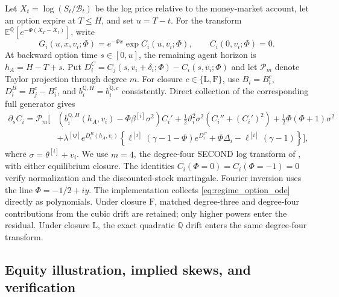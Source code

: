 \documentclass[11pt]{article}
\theoremstyle{remark}
\newcommand{\E}{\mathbb{E}}
\newcommand{\QQ}{\mathbb{Q}}
\begin{document}
Let $X_t=\log(S_t/\mathcal B_t)$ be the log price relative to the money-market
account, let an option expire at $T\le H$, and set $u=T-t$.  For the transform
$\E^{\QQ}[e^{-\Phi(X_T-X_t)}]$, write
\begin{equation}\label{eq:regime_option_ansatz}
G_i(u,x,v_i;\Phi)=e^{-\Phi x}\exp C_i(u,v_i;\Phi),
\qquad C_i(0,v_i;\Phi)=0.
\end{equation}
At backward option time $s\in[0,u]$, the remaining agent horizon is
$h_A=H-T+s$.  Put
$D_i^C=C_j(s,v_i+\delta_i;\Phi)-C_i(s,v_i;\Phi)$ and let $\mathcal P_m$
denote Taylor projection through degree $m$.  For closure
$c\in\{\mathrm L,\mathrm F\}$, use $B_i=B_i^c$,
$D_i^B=B_j^c-B_i^c$, and $b_i^{\QQ,H}=b_i^{\QQ,c}$ consistently.
Direct collection of the corresponding full generator gives
\begin{equation}\label{eq:regime_option_ode}
\begin{split}
\partial_s C_i=\mathcal P_m\Big[&
\left(b_i^{\QQ,H}(h_A,v_i)-\Phi\beta^{[i]}\sigma^2\right)C_i'
+\frac12\vartheta_i^2\sigma^2\left(C_i''+(C_i')^2\right)
+\frac12\Phi(\Phi+1)\sigma^2\\
&+\lambda^{[ij]}e^{D_i^B(h_A,v_i)}
\left\{\ell^{[i]}(\gamma-1-\Phi)e^{D_i^C}
+\Phi\Delta_i-\ell^{[i]}(\gamma-1)\right\}\Big],
\end{split}
\end{equation}
where $\sigma=\theta^{[i]}+v_i$.  We use $m=4$, the degree-four SECOND log
transform of \cite{SeppRakhmonov2024}, with either equilibrium closure.  The identities
$C_i(\Phi=0)=C_i(\Phi=-1)=0$ verify normalization and the discounted-stock
martingale.  Fourier inversion uses the line $\Phi=-1/2+iy$.  The implementation
collects \eqref{eq:regime_option_ode} directly as polynomials.  Under closure
$\mathrm F$, matched degree-three and degree-four contributions from the cubic
drift are retained; only higher powers enter the residual.  Under closure
$\mathrm L$, the exact quadratic $\QQ$ drift enters the same degree-four transform.

\subsection{Equity illustration, implied skews, and verification}
\end{document}

